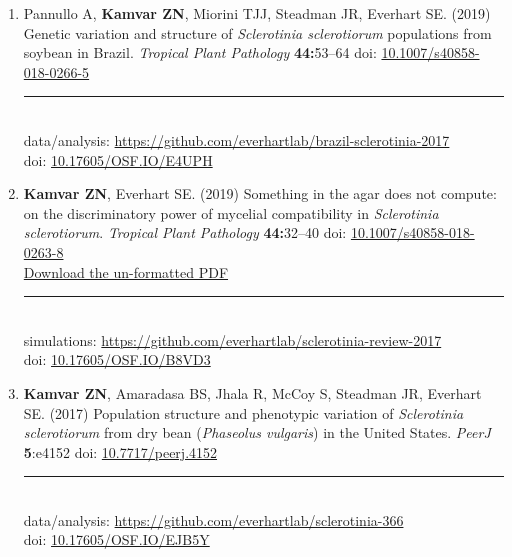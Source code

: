 \begin{enumerate}[leftmargin = 14pt]
	\vspace{3pt}
  
  \item Pannullo A, \textbf{Kamvar ZN}, Miorini TJJ, Steadman JR, Everhart SE.
    (2019) Genetic variation and structure of \textit{Sclerotinia sclerotiorum}
    populations from soybean in Brazil. \textit{Tropical Plant Pathology} \textbf{44:}53--64 doi:
    \href{https://doi.org/10.1007/s40858-018-0266-5}{10.1007/s40858-018-0266-5}\\
	\rule[0.25\baselineskip]{0.25\textwidth}{0.5pt}\\
  data/analysis: \href{https://github.com/everhartlab/brazil-sclerotinia-2017#readme}{https://github.com/everhartlab/brazil-sclerotinia-2017}\\
  doi:\phantom{t/analysis:}  \href{https://doi.org/10.17605/OSF.IO/E4UPH}{10.17605/OSF.IO/E4UPH} 

	\vspace{3pt}
  
  \item \textbf{Kamvar ZN}, Everhart SE. (2019) Something in the agar does not
    compute: on the discriminatory power of mycelial compatibility in
    \textit{Sclerotinia sclerotiorum}. \textit{Tropical Plant Pathology} \textbf{44:}32--40  doi:
    \href{https://doi.org/10.1007/s40858-018-0263-8}{10.1007/s40858-018-0263-8}\\
    \href{https://github.com/everhartlab/sclerotinia-review-2017/raw/master/manuscript/review.pdf}{Download the un-formatted PDF}\\
	\rule[0.25\baselineskip]{0.25\textwidth}{0.5pt}\\
  simulations: \href{https://github.com/everhartlab/sclerotinia-review-2017#readme}{https://github.com/everhartlab/sclerotinia-review-2017}\\
    doi:\phantom{mlatons:} \href{https://doi.org/10.17605/OSF.IO/B8VD3}{10.17605/OSF.IO/B8VD3} 

	\vspace{3pt}
  
	\item \textbf{Kamvar ZN}, Amaradasa BS, Jhala R, McCoy S, Steadman JR,
	Everhart SE. (2017) Population structure and phenotypic variation of
	\textit{Sclerotinia sclerotiorum} from dry bean (\textit{Phaseolus vulgaris})
	in the United States. \textit{PeerJ} \textbf{5}:e4152 doi: \href{https://doi.org/10.7717/peerj.4152}{10.7717/peerj.4152}\\
	\rule[0.25\baselineskip]{0.25\textwidth}{0.5pt}\\
	data/analysis: \href{https://github.com/everhartlab/sclerotinia-366#readme}{https://github.com/everhartlab/sclerotinia-366}\\
	doi:\phantom{t/analysis:}
	\href{https://doi.org/10.17605/OSF.IO/EJB5Y}{10.17605/OSF.IO/EJB5Y}


\end{enumerate}
